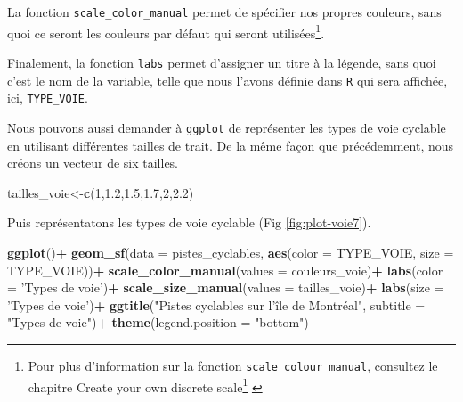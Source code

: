 \documentclass[
  12pt,
]{krantz}
\newenvironment{Shaded}{\begin{snugshade}}{\end{snugshade}}
\newcommand{\DataTypeTok}[1]{\textcolor[rgb]{0.13,0.29,0.53}{#1}}
\newcommand{\DecValTok}[1]{\textcolor[rgb]{0.00,0.00,0.81}{#1}}
\newcommand{\FloatTok}[1]{\textcolor[rgb]{0.00,0.00,0.81}{#1}}
\newcommand{\KeywordTok}[1]{\textcolor[rgb]{0.13,0.29,0.53}{\textbf{#1}}}
\newcommand{\NormalTok}[1]{#1}
\newcommand{\OperatorTok}[1]{\textcolor[rgb]{0.81,0.36,0.00}{\textbf{#1}}}
\newcommand{\StringTok}[1]{\textcolor[rgb]{0.31,0.60,0.02}{#1}}
\renewcommand{\href}[2]{#2\footnote{\url{#1}}}
\begin{document}
La fonction \texttt{scale\_color\_manual} permet de spécifier nos propres couleurs, sans quoi ce seront les couleurs par défaut qui seront utilisées\footnote{Pour plus d'information sur la fonction \texttt{scale\_colour\_manual}, consultez le chapitre \href{https://ggplot2.tidyverse.org/reference/scale_manual.html}{Create your own discrete scale} \citep{Wickham_ggplot2_2016}}.

Finalement, la fonction \texttt{labs} permet d'assigner un titre à la légende, sans quoi c'est le nom de la variable, telle que nous l'avons définie dans \texttt{R} qui sera affichée, ici, \texttt{TYPE\_VOIE}.

Nous pouvons aussi demander à \texttt{ggplot} de représenter les types de voie cyclable en utilisant différentes tailles de trait. De la même façon que précédemment, nous créons un vecteur de six tailles.

\begin{Shaded}
\begin{Highlighting}[]
\NormalTok{tailles_voie<-}\KeywordTok{c}\NormalTok{(}\DecValTok{1}\NormalTok{,}\FloatTok{1.2}\NormalTok{,}\FloatTok{1.5}\NormalTok{,}\FloatTok{1.7}\NormalTok{,}\DecValTok{2}\NormalTok{,}\FloatTok{2.2}\NormalTok{)}
\end{Highlighting}
\end{Shaded}

Puis représentatons les types de voie cyclable (Fig \ref{fig:plot-voie7}).

\begin{Shaded}
\begin{Highlighting}[]
\KeywordTok{ggplot}\NormalTok{()}\OperatorTok{+}
\StringTok{  }\KeywordTok{geom_sf}\NormalTok{(}\DataTypeTok{data =}\NormalTok{ pistes_cyclables,  }\KeywordTok{aes}\NormalTok{(}\DataTypeTok{color =}\NormalTok{ TYPE_VOIE, }\DataTypeTok{size =}\NormalTok{ TYPE_VOIE))}\OperatorTok{+}
\StringTok{  }\KeywordTok{scale_color_manual}\NormalTok{(}\DataTypeTok{values =}\NormalTok{ couleurs_voie)}\OperatorTok{+}
\StringTok{  }\KeywordTok{labs}\NormalTok{(}\DataTypeTok{color =} \StringTok{'Types de voie'}\NormalTok{)}\OperatorTok{+}
\StringTok{  }\KeywordTok{scale_size_manual}\NormalTok{(}\DataTypeTok{values =}\NormalTok{ tailles_voie)}\OperatorTok{+}
\StringTok{  }\KeywordTok{labs}\NormalTok{(}\DataTypeTok{size =} \StringTok{'Types de voie'}\NormalTok{)}\OperatorTok{+}
\StringTok{  }\KeywordTok{ggtitle}\NormalTok{(}\StringTok{"Pistes cyclables sur l'île de Montréal"}\NormalTok{, }\DataTypeTok{subtitle =} \StringTok{"Types de voie"}\NormalTok{)}\OperatorTok{+}
\StringTok{  }\KeywordTok{theme}\NormalTok{(}\DataTypeTok{legend.position =} \StringTok{"bottom"}\NormalTok{)}
\end{Highlighting}
\end{Shaded}
\end{document}
